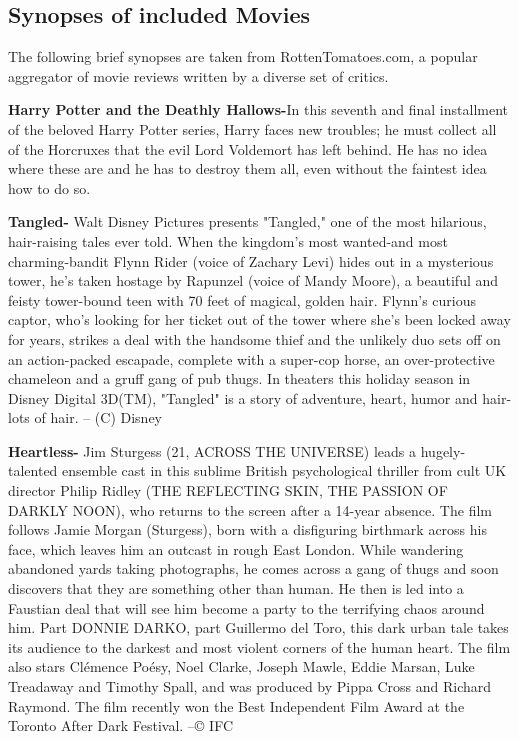 \documentclass[11pt]{article}
\begin{document}
\subsection{Synopses of included Movies}
The following brief synopses are taken from RottenTomatoes.com, a popular aggregator of movie reviews written by a diverse set of critics.

\textbf{Harry Potter and the Deathly Hallows-}In this seventh and final installment of the beloved Harry Potter series, Harry faces new troubles; he must collect all of the Horcruxes that the evil Lord Voldemort has left behind. He has no idea where these are and he has to destroy them all, even without the faintest idea how to do so.
 
\textbf{Tangled-} Walt Disney Pictures presents "Tangled," one of the most hilarious, hair-raising tales ever told. When the kingdom's most wanted-and most charming-bandit Flynn Rider (voice of Zachary Levi) hides out in a mysterious tower, he's taken hostage by Rapunzel (voice of Mandy Moore), a beautiful and feisty tower-bound teen with 70 feet of magical, golden hair. Flynn's curious captor, who's looking for her ticket out of the tower where she's been locked away for years, strikes a deal with the handsome thief and the unlikely duo sets off on an action-packed escapade, complete with a super-cop horse, an over-protective chameleon and a gruff gang of pub thugs. In theaters this holiday season in Disney Digital 3D(TM), "Tangled" is a story of adventure, heart, humor and hair-lots of hair. -- (C) Disney

\textbf{Heartless-} Jim Sturgess (21, ACROSS THE UNIVERSE) leads a hugely-talented ensemble cast in this sublime British psychological thriller from cult UK director Philip Ridley (THE REFLECTING SKIN, THE PASSION OF DARKLY NOON), who returns to the screen after a 14-year absence. The film follows Jamie Morgan (Sturgess), born with a disfiguring birthmark across his face, which leaves him an outcast in rough East London. While wandering abandoned yards taking photographs, he comes across a gang of thugs and soon discovers that they are something other than human. He then is led into a Faustian deal that will see him become a party to the terrifying chaos around him. Part DONNIE DARKO, part Guillermo del Toro, this dark urban tale takes its audience to the darkest and most violent corners of the human heart. The film also stars Clémence Poésy, Noel Clarke, Joseph Mawle, Eddie Marsan, Luke Treadaway and Timothy Spall, and was produced by Pippa Cross and Richard Raymond. The film recently won the Best Independent Film Award at the Toronto After Dark Festival. --© IFC
\end{document}
